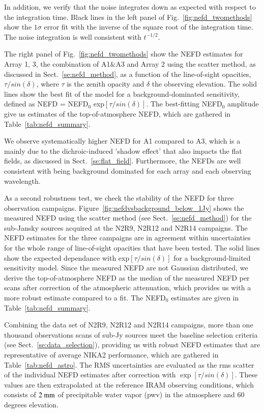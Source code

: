 In addition, we verify that the noise integrates down as expected with
respect to the integration time. Black lines in the left panel of
Fig.~\ref{fig:nefd_twomethods} show the $1\sigma$ error fit with the
inverse of the square root of the integration time. The noise
integration is well consistent with $t^{-1/2}$.

The right panel of Fig.~\ref{fig:nefd_twomethods} show the NEFD
estimates for  Array 1, 3, the combination of A1$\&$A3 and Array 2
using the scatter method, as discussed in Sect.~\ref{se:nefd_method},
as a function of the line-of-sight opacities, $\tau/sin(\delta)$,
where $\tau$ is the zenith opacity and $\delta$ the observing
elevation. The solid lines show the best fit of the model for a
background-dominated sensitivity,
defined as NEFD = NEFD$_0$ exp${[\tau/sin(\delta)]}$. The best-fitting
NEFD$_0$ amplitude give us estimates of the
top-of-atmosphere NEFD, which are gathered in
Table~\ref{tab:nefd_summary}.

We observe systematically higher NEFD for A1 compared to
A3, which is a mainly due to the dichroic-induced 'shadow effect' that
also impacts the flat fields, as discussed in
Sect.~\ref{se:flat_field}. Furthermore, the NEFDs are well consistent
with being background dominated for each array and each observing
wavelength. 


As a second robustness test, we check the stability of the NEFD for
three observation campaigns. Figure~\ref{fig:nefdvsbackground_below_1Jy} shows the
measured NEFD using the scatter method (see Sect.~\ref{se:nefd_method}) for the
sub-Jansky sources acquired at the N2R9, N2R12 and N2R14
campaigns. The NEFD estimates for the
three campaigns are in agreement within uncertainties for the whole
range of line-of-sight opacities that have been tested.
The solid lines show the expected dependance with
exp${[\tau/sin(\delta)]}$ for a background-limited sensitivity
model. Since the measured NEFD are not Gaussian distributed, we
derive the top-of-atmosphere NEFD as the median of the measured NEFD
per scans after correction of the atmospheric attenuation, which provides us
with a more robust estimate compared to a fit. The NEFD$_0$ estimates
are given in Table~\ref{tab:nefd_summary}.

Combining the data set of N2R9, N2R12 and N2R14 campaigns,
more than one thousand observations scans of sub-Jy sources meet the
baseline selection criteria (see Sect.~\ref{se:data_selection}),
providing us with robust NEFD estimates that are representative of
average NIKA2 performance, which are gathered in
Table~\ref{tab:nefd_astro}.
The RMS uncertainties are evaluated as the rms scatter of the
individual NEFD estimates after correction with
$\exp[\tau/sin(\delta)]$. These values are then extrapolated at the
reference IRAM observing conditions, which consists of $2~\rm{mm}$
of precipitable water vapor (pwv) in the atmosphere and $60$ degrees
elevation.  


